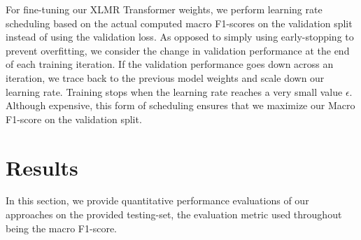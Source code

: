 \documentclass[
]{ceurart}
\begin{document}

For fine-tuning our XLMR Transformer weights, we perform learning rate scheduling based on the actual computed macro F1-scores on the validation split instead of using the validation loss. As opposed to simply using early-stopping to prevent overfitting, we consider the change in validation performance at the end of each training iteration. If the validation performance goes down across an iteration, we trace back to the previous model weights and scale down our learning rate. Training stops when the learning rate reaches a very small value $\epsilon$. Although expensive, this form of scheduling ensures that we maximize our Macro F1-score on the validation split.

\section{Results}
\label{sec:results}
In this section, we provide quantitative performance evaluations of our approaches on the provided testing-set, the evaluation metric used throughout being the macro F1-score. 


\end{document}
